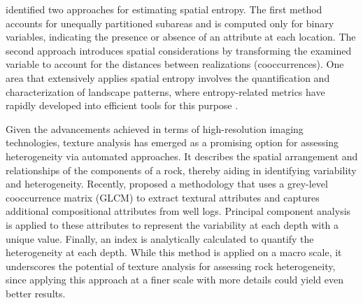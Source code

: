 \citet{altieri2019advances} identified two approaches for estimating spatial entropy. The first method accounts for unequally partitioned subareas and is computed only for binary variables, indicating the presence or absence of an attribute at each location. The second approach introduces spatial considerations by transforming the examined variable to account for the distances between realizations (cooccurrences). One area that extensively applies spatial entropy involves the quantification and characterization of landscape patterns, where entropy-related metrics have rapidly developed into efficient tools for this purpose \citep{8963966, vranken2015review, wang2018spatial}.

Given the advancements achieved in terms of high-resolution imaging technologies, texture analysis has emerged as a promising option for assessing heterogeneity via automated approaches. It describes the spatial arrangement and relationships of the components of a rock, thereby aiding in identifying variability and heterogeneity. Recently, \citet{sahu2024assessment} proposed a methodology that uses a grey-level cooccurrence matrix (GLCM) to extract textural attributes and captures additional compositional attributes from well logs. Principal component analysis \citep{abdi2010principal} is applied to these attributes to represent the variability at each depth with a unique value. Finally, an index is analytically calculated to quantify the heterogeneity at each depth. While this method is applied on a macro scale, it underscores the potential of texture analysis for assessing rock heterogeneity, since applying this approach at a finer scale with more details could yield even better results.